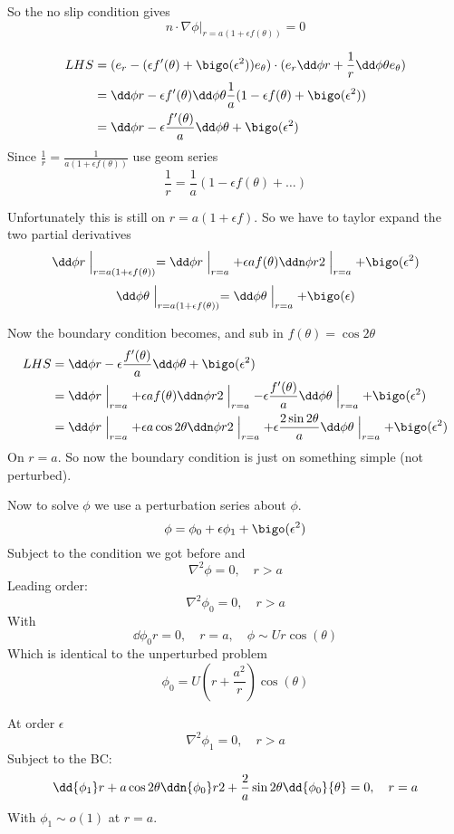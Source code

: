 \documentclass{/home/janmebows/Documents/LatexTemplates/myassignment}
\begin{document}
So the no slip condition gives
\[n \cdot \nabla \phi|_{r = a(1+\epsilon f(\theta))} = 0\]

\begin{align*}
    LHS &= (e_r - (\epsilon f'(\theta) + \bigo(\epsilon^2))e_\theta) \cdot (e_r \dd\phi r + \frac1r \dd\phi \theta e_\theta )\\
    &= \dd\phi r - \epsilon f'(\theta) \dd\phi\theta \frac1a(1-\epsilon f(\theta) + \bigo(\epsilon^2))\\
    &=\dd\phi r - \epsilon \frac{f'(\theta)}{a} \dd\phi\theta + \bigo(\epsilon^2)
\end{align*}
Since $\frac1r = \frac1{a(1+\epsilon f(\theta))}$ use geom series
\[\frac1r = \frac1a (1-\epsilon f(\theta) + \hdots)\]


Unfortunately this is still on $r=a(1+\epsilon f)$. So we have to taylor expand the two partial derivatives
\[\dd\phi r\Bigm|_{r=a(1+\epsilon f(\theta))} = \dd\phi r\Bigm|_{r=a} + \epsilon a f(\theta) \ddn \phi r2\Bigm|_{r=a} + \bigo(\epsilon^2)\]
\[\dd\phi \theta \Bigm|_{r=a(1+\epsilon f(\theta))} = \dd\phi\theta\Bigm|_{r=a} + \bigo(\epsilon) \]

Now the boundary condition becomes, and sub in $f(\theta) = \cos2\theta$
\begin{align*}
    LHS &= \dd\phi r - \epsilon \frac{f'(\theta)}{a} \dd\phi\theta + \bigo(\epsilon^2)\\
    &=\dd\phi r\Bigm|_{r=a} + \epsilon a f(\theta) \ddn \phi r2\Bigm|_{r=a}  - \epsilon \frac{f'(\theta)}{a}\dd\phi\theta\Bigm|_{r=a} + \bigo(\epsilon^2)\\
    &=\dd\phi r\Bigm|_{r=a} + \epsilon a \cos2\theta \ddn \phi r2\Bigm|_{r=a}  + \epsilon \frac{2\sin2\theta}{a}\dd\phi\theta\Bigm|_{r=a} + \bigo(\epsilon^2)\\
\end{align*}
On $r = a$. So now the boundary condition is just on something simple (not perturbed).


Now to solve $\phi$ we use a perturbation series about $\phi$.
\[\phi = \phi_0 + \epsilon \phi_1 + \bigo(\epsilon^2)\]
Subject to the condition we got before and
\[\nabla^2 \phi = 0, \quad r>a\]
Leading order:
\[\nabla^2 \phi_0 = 0,\quad r>a\]
With
\[\dd{\phi_0}r = 0, \quad r=a, \quad \phi \sim Ur\cos(\theta)\]
Which is identical to the unperturbed problem
\[\phi_0 = U(r + \frac{a^2}{r})\cos(\theta)\]


At order $\epsilon$
\[\nabla^2 \phi_1 = 0, \quad r >a\]
Subject to the BC:
\[\dd{\phi_1}r +a \cos2\theta \ddn{\phi_0}r2 + \frac{2}{a} \sin2\theta \dd{\phi_0}{\theta} = 0, \quad r=a\]
With $\phi_1 \sim o(1)$ at $r=a$.
\end{document}

